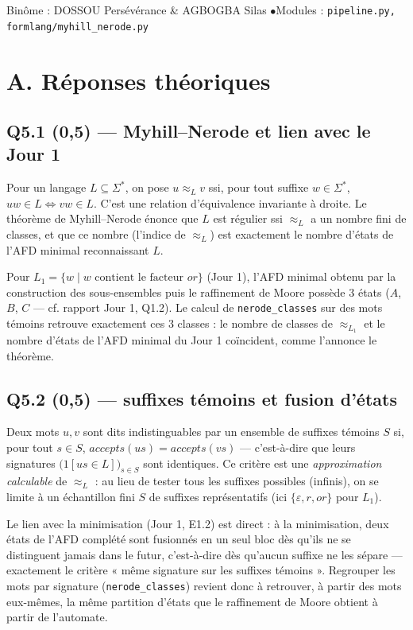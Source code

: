 \documentclass[11pt,a4paper]{scrartcl}
\begin{document}
{Binôme : DOSSOU Persévérance \& AGBOGBA Silas \quad$\bullet$\quad Modules : \texttt{pipeline.py, formlang/myhill\_nerode.py}}

\section*{A. Réponses théoriques}

\subsection*{Q5.1 (0,5) — Myhill–Nerode et lien avec le Jour 1}
Pour un langage $L\subseteq\Sigma^*$, on pose $u\approx_L v$ ssi, pour tout
suffixe $w\in\Sigma^*$, $uw\in L \Leftrightarrow vw\in L$. C'est une relation
d'équivalence invariante à droite. Le théorème de Myhill–Nerode énonce que
$L$ est régulier ssi $\approx_L$ a un nombre fini de classes, et que ce
nombre (l'indice de $\approx_L$) est exactement le nombre d'états de l'AFD
minimal reconnaissant $L$.

Pour $L_1=\{w \mid w \text{ contient le facteur } or\}$ (Jour 1), l'AFD
minimal obtenu par la construction des sous-ensembles puis le raffinement de
Moore possède $\boxed{3}$ états ($A$, $B$, $C$ — cf. rapport Jour 1, Q1.2).
Le calcul de \texttt{nerode\_classes} sur des mots témoins retrouve
exactement ces $\boxed{3}$ classes : le nombre de classes de $\approx_{L_1}$
et le nombre d'états de l'AFD minimal du Jour 1 coïncident, comme l'annonce
le théorème.

\subsection*{Q5.2 (0,5) — suffixes témoins et fusion d'états}
Deux mots $u,v$ sont dits indistinguables par un ensemble de suffixes
témoins $S$ si, pour tout $s\in S$, $accepts(us)=accepts(vs)$ — c'est-à-dire
que leurs signatures $\big(1[us\in L]\big)_{s\in S}$ sont identiques.
Ce critère est une \emph{approximation calculable} de $\approx_L$ : au lieu
de tester tous les suffixes possibles (infinis), on se limite à un
échantillon fini $S$ de suffixes représentatifs (ici $\{\varepsilon, r, or\}$
pour $L_1$).

Le lien avec la minimisation (Jour 1, E1.2) est direct : à la minimisation,
deux états de l'AFD complété sont fusionnés en un seul bloc dès qu'ils ne se
distinguent jamais dans le futur, c'est-à-dire dès qu'aucun suffixe ne les
sépare — exactement le critère « même signature sur les suffixes témoins ».
Regrouper les mots par signature (\texttt{nerode\_classes}) revient donc à
retrouver, à partir des mots eux-mêmes, la même partition d'états que le
raffinement de Moore obtient à partir de l'automate.
\end{document}
